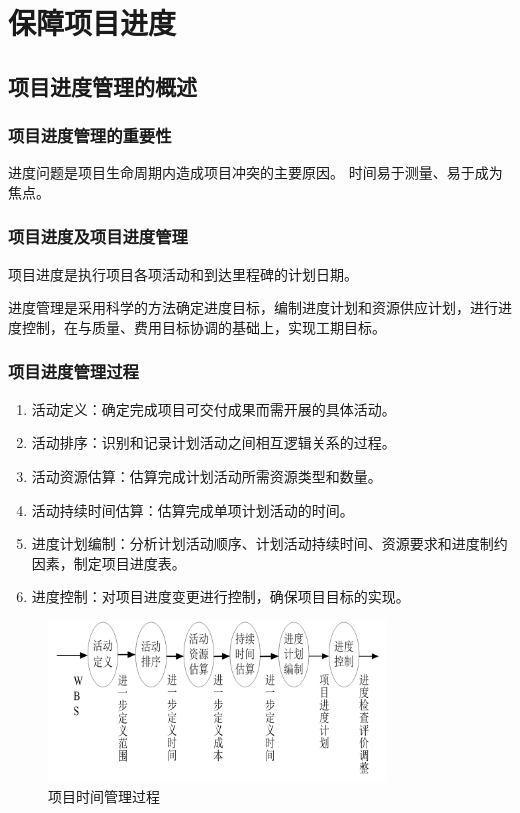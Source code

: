 \chapter{保障项目进度}
\section{项目进度管理的概述}
\subsection{项目进度管理的重要性}
进度问题是项目生命周期内造成项目冲突的主要原因。
时间易于测量、易于成为焦点。
\subsection{项目进度及项目进度管理}
项目进度是执行项目各项活动和到达里程碑的计划日期。
\par 进度管理是采用科学的方法确定进度目标，编制进度计划和资源供应计划，进行进度控制，在与质量、费用目标协调的基础上，实现工期目标。
\subsection{项目进度管理过程}
\begin{enumerate}
	\item 活动定义：确定完成项目可交付成果而需开展的具体活动。
	\item 活动排序：识别和记录计划活动之间相互逻辑关系的过程。
	\item 活动资源估算：估算完成计划活动所需资源类型和数量。
	\item 活动持续时间估算：估算完成单项计划活动的时间。
	\item 进度计划编制：分析计划活动顺序、计划活动持续时间、资源要求和进度制约因素，制定项目进度表。
	\item 进度控制：对项目进度变更进行控制，确保项目目标的实现。
\end{enumerate}
\begin{figure}[!h]
	\centering
	\includegraphics[width=0.8\textwidth]{image/5-1}
	\caption{项目时间管理过程}
\end{figure}
